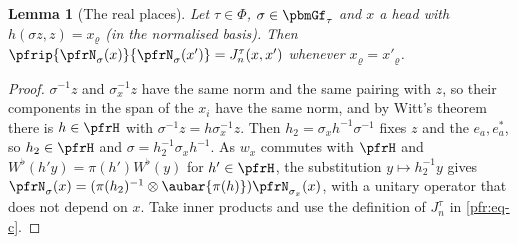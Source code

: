 \documentclass[10pt]{amsart}
\newtheorem{lemma}[theorem]{Lemma}
\theoremstyle{definition}
\theoremstyle{remark}
\providecommand{\auPl}{\Phi}
\begin{document}
\begin{lemma}[The real places]\label{pff:topreal}
Let $\tau\in\auPl$, $\sigma\in\pbmGf_\tau$ and $x$ a head with $h(\sigma z,z)=x_\varrho$ (in the normalised
basis). Then $\pfrip{\pfrN_\sigma(x)}{\pfrN_\sigma(x')}=J^\tau_n(x,x')$ whenever $x_\varrho=x'_\varrho$.
\end{lemma}
\begin{proof}
$\sigma^{-1}z$ and $\sigma_x^{-1}z$ have the same norm and the same pairing with $z$, so their components in
the span of the $x_i$ have the same norm, and by Witt's theorem there is $h\in\pfrH$ with $\sigma^{-1}z=
h\sigma_x^{-1}z$. Then $h_2=\sigma_xh^{-1}\sigma^{-1}$ fixes $z$ and the $e_a,e_a^*$, so $h_2\in\pfrH$ and
$\sigma=h_2^{-1}\sigma_xh^{-1}$. As $w_x$ commutes with $\pfrH$ and $W^\flat(h'y)=\pi(h')W^\flat(y)$ for
$h'\in\pfrH$, the substitution $y\mapsto h_2^{-1}y$ gives $\pfrN_\sigma(x)=(\pi(h_2)^{-1}\otimes\aubar{\pi(h)})
\pfrN_{\sigma_x}(x)$, with a unitary operator that does not depend on $x$. Take inner products and use
the definition of $J^\tau_n$ in \eqref{pfr:eq-c}.
\end{proof}
\end{document}
